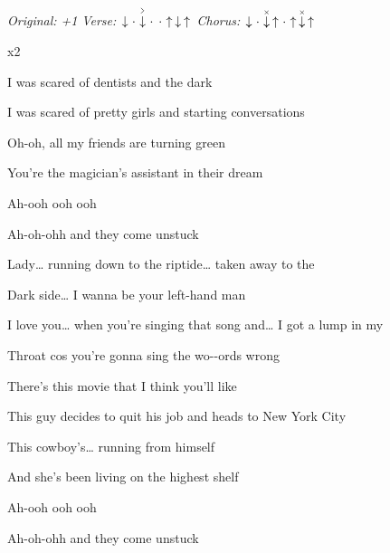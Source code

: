 \begin{song}


\begin{headerbox}
\RaiseBoxWithAccents
\textit{Original: +1} \quad
\textit{Verse:} $\Down\Miss\AccentDown\Miss\Miss\Up\Down\Up$ \quad
\textit{Chorus:} $\Down\Miss\ChuckDown\Up\Miss\Up\ChuckDown\Up$
\end{headerbox}

\begin{hchordbox}
\end{hchordbox}

\large

\bigskip

    x2

\bigskip

I was scared of dentists and the dark \par
{}I was scared of pretty girls and starting conversations \par
Oh-oh, all my friends are turning green \par
You're the magician's assistant in their dream \par
Ah-ooh ooh ooh \par
Ah-oh-ohh  and they come unstuck \par

\bigskip

\begin{chorusbox}{\Chorus}
Lady… running down to the riptide… taken away to the \par
{}Dark side… I wanna be your left-hand man \par
I love you… when you're singing that song and… I got a lump in my \par
{}Throat cos you're gonna sing the wo--ords wrong \par
\end{chorusbox}

\bigskip

There's this movie that I think you'll like \par
This  guy decides to quit his job and heads to New York City \par
This cowboy's… running from himself \par
And she's been living on the highest shelf \par
Ah-ooh ooh ooh \par
Ah-oh-ohh  and they come unstuck \par


\end{song}
